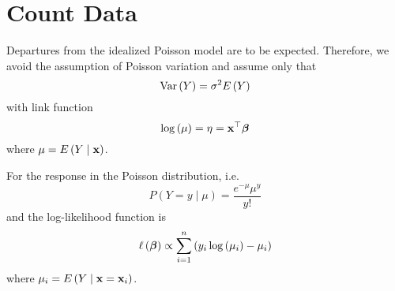 \section{Count Data}

Departures from the idealized Poisson model are to be expected. Therefore, we avoid the assumption of Poisson variation and assume only that
\begin{equation}
	\mathrm{Var}\left(Y\right)=\sigma^{2}E\left(Y\right)
\end{equation}
with link function
\begin{equation}
	\log\left(\mu\right)=\eta={\bf x}^{\top}\boldsymbol{\beta}
\end{equation}
where $\mu=E\left(Y\mid{\bf x}\right)$.

For the response in the Poisson distribution, i.e.
\begin{equation*}
	P(Y=y\mid\mu)=\frac{e^{-\mu}\mu^{y}}{y!}
\end{equation*}
and the log-likelihood function is
\begin{equation}
	\ell\left(\boldsymbol{\beta}\right)\propto\sum_{i=1}^{n}\left(y_{i} \log\left(\mu_{i}\right)-\mu_{i}\right)
\end{equation}
where $\mu_{i}=E\left(Y\mid{\bf x}={\bf x}_{i}\right)$.
